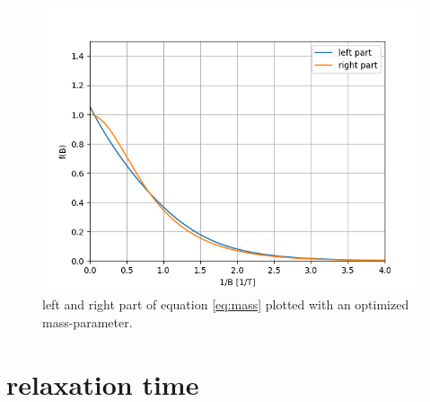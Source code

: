 \documentclass[12pt,a4paper]{article}
\begin{document}
\begin{figure}
\centering
\includegraphics[scale=0.8]{Bilder/m.png}
\caption{left and right part of equation \ref{eq:mass} plotted with an optimized mass-parameter.}
\label{fig:m}
\end{figure}



\section{relaxation time}
\end{document}
